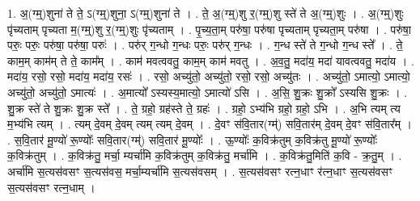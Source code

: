\documentclass[17pt]{extarticle}
\begin{document}
1. अ॒(ग्म्॒)शुना॑ ते ते॒ ऽ(ग्म्॒)शुना॒ ऽ(ग्म्॒)शुना॑ ते । . ते॒ अ॒(ग्म्॒)शु र॒(ग्म्॒)शु स्ते॑ ते अ॒(ग्म्॒)शुः । . अ॒(ग्म्॒)शुः पृ॑च्यताम् पृच्यता म॒(ग्म्॒)शु र॒(ग्म्॒)शुः पृ॑च्यताम् । . पृ॒च्य॒ता॒म् परु॑षा॒ परु॑षा पृच्यताम् पृच्यता॒म् परु॑षा । . परु॑षा॒ परुः॒ परुः॒ परु॑षा॒ परु॑षा॒ परुः॑ । . परु॑र् ग॒न्धो ग॒न्धः परुः॒ परु॑र् ग॒न्धः । . ग॒न्ध स्ते॑ ते ग॒न्धो ग॒न्ध स्ते᳚ । . ते॒ काम॒म् काम॑म् ते ते॒ काम᳚म् । . काम॑ मवत्ववतु॒ काम॒म् काम॑ मवतु । . अ॒व॒तु॒ मदा॑य॒ मदा॑ यावत्ववतु॒ मदा॑य । . मदा॑य॒ रसो॒ रसो॒ मदा॑य॒ मदा॑य॒ रसः॑ । . रसो॒ अच्यु॑तो॒ अच्यु॑तो॒ रसो॒ रसो॒ अच्यु॑तः । . अच्यु॑तो॒ ऽमात्यो॒ ऽमात्यो॒ अच्यु॑तो॒ अच्यु॑तो॒ ऽमात्यः॑ । . अ॒मात्यो᳚ ऽस्यस्य॒मात्यो॒ ऽमात्यो॑ ऽसि । . अ॒सि॒ शु॒क्रः शु॒क्रो᳚ ऽस्यसि शु॒क्रः । . शु॒क्र स्ते॑ ते शु॒क्रः शु॒क्र स्ते᳚ । . ते॒ ग्रहो॒ ग्रह॑स्ते ते॒ ग्रहः॑ । . ग्रहो॒ ऽभ्य॑भि ग्रहो॒ ग्रहो॒ ऽभि । . अ॒भि त्यम् त्य म॒भ्य॑भि त्यम् । . त्यम् दे॒वम् दे॒वम् त्यम् त्यम् दे॒वम् । . दे॒वꣳ स॑वि॒तार(ग्म्॑) सवि॒तार॑म् दे॒वम् दे॒वꣳ स॑वि॒तार᳚म् । . स॒वि॒तार॑ मू॒ण्यो॑ रू॒ण्योः᳚ सवि॒तार(ग्म्॑) सवि॒तार॑ मू॒ण्योः᳚ । . ऊ॒ण्योः᳚ क॒विक्र॑तुम् क॒विक्र॑तु मू॒ण्यो॑ रू॒ण्योः᳚ क॒विक्र॑तुम् । . क॒विक्र॑तु॒ मर्चा॒ म्यर्चा॑मि क॒विक्र॑तुम् क॒विक्र॑तु॒ मर्चा॑मि । . क॒विक्र॑तु॒मिति॑ क॒वि - क्र॒तु॒म् । . अर्चा॑मि स॒त्यस॑वसꣳ स॒त्यस॑वस॒ मर्चा॒म्यर्चा॑मि स॒त्यस॑वसम् । . स॒त्यस॑वसꣳ रत्न॒धाꣳ र॑त्न॒धाꣳ स॒त्यस॑वसꣳ स॒त्यस॑वसꣳ रत्न॒धाम् । \newline
\end{document}
